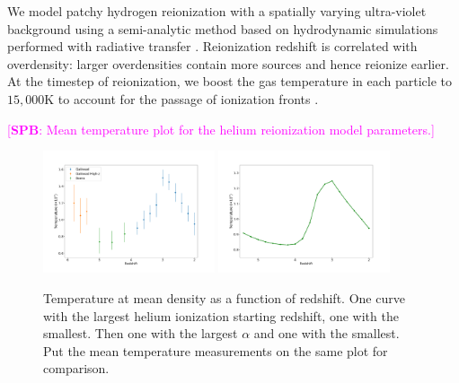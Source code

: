 \documentclass[a4paper,11pt]{article}
\newcommand{\spb}[1]{{\textcolor{magenta}{[{\bf SPB}: #1]}}}
\begin{document}
We model patchy hydrogen reionization with a spatially varying ultra-violet background using a semi-analytic method based on hydrodynamic simulations performed with radiative transfer \citep[for more details see][]{Battaglia:2013, Bird:2022}. Reionization redshift is correlated with overdensity:  larger overdensities contain more sources and hence reionize earlier.
At the timestep of reionization, we boost the gas temperature in each particle to $15,000$K to account for the passage of ionization fronts \citep{DAloisio:2019}.

\spb{Mean temperature plot for the helium reionization model parameters.}

\begin{figure}
\includegraphics[width=0.45\textwidth]{figures/temp_observed.pdf}
\includegraphics[width=0.45\textwidth]{figures/temps.pdf}
 \caption{Temperature at mean density as a function of redshift. One curve with the largest helium ionization starting redshift, one with the smallest. Then one with the largest $\alpha$ and one with the smallest. Put the mean temperature measurements on the same plot for comparison.}
 \label{fig:heliumtempdens}
\end{figure}
\end{document}
